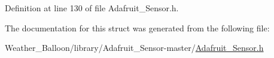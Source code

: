 Definition at line 130 of file Adafruit\+\_\+\+Sensor.\+h.



The documentation for this struct was generated from the following file\+:\begin{DoxyCompactItemize}
\item 
Weather\+\_\+\+Balloon/library/\+Adafruit\+\_\+\+Sensor-\/master/\hyperlink{_adafruit___sensor_8h}{Adafruit\+\_\+\+Sensor.\+h}\end{DoxyCompactItemize}
